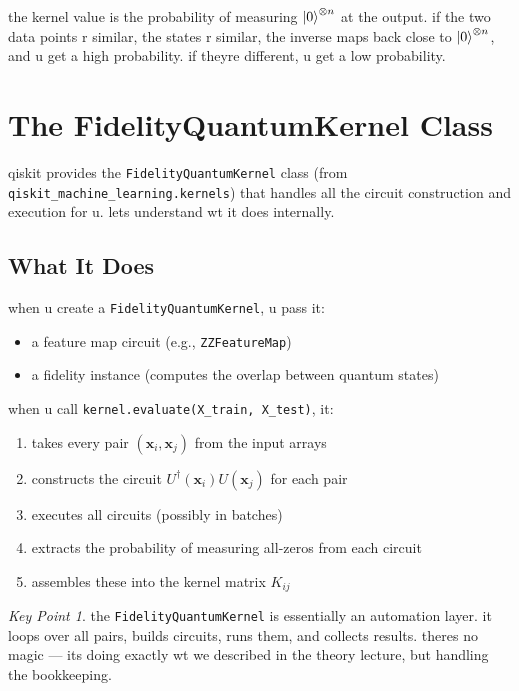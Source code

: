\documentclass[11pt,a4paper]{article}
\theoremstyle{definition}
\theoremstyle{remark}
\newtheorem*{keypoint}{Key Point}
\begin{document}
the kernel value is the probability of measuring $\ket{0}^{\otimes n}$ at the output. if the two data points r similar, the states r similar, the inverse maps back close to $\ket{0}^{\otimes n}$, and u get a high probability. if theyre different, u get a low probability.

\section{The FidelityQuantumKernel Class}

qiskit provides the \texttt{FidelityQuantumKernel} class (from \texttt{qiskit\_machine\_learning.kernels}) that handles all the circuit construction and execution for u. lets understand wt it does internally.

\subsection{What It Does}

when u create a \texttt{FidelityQuantumKernel}, u pass it:
\begin{itemize}[leftmargin=*]
    \item a feature map circuit (e.g., \texttt{ZZFeatureMap})
    \item a fidelity instance (computes the overlap between quantum states)
\end{itemize}

when u call \texttt{kernel.evaluate(X\_train, X\_test)}, it:
\begin{enumerate}[leftmargin=*]
    \item takes every pair $(\mathbf{x}_i, \mathbf{x}_j)$ from the input arrays
    \item constructs the circuit $U^\dagger(\mathbf{x}_i) U(\mathbf{x}_j)$ for each pair
    \item executes all circuits (possibly in batches)
    \item extracts the probability of measuring all-zeros from each circuit
    \item assembles these into the kernel matrix $K_{ij}$
\end{enumerate}

\begin{keypoint}
the \texttt{FidelityQuantumKernel} is essentially an automation layer. it loops over all pairs, builds circuits, runs them, and collects results. theres no magic --- its doing exactly wt we described in the theory lecture, but handling the bookkeeping.
\end{keypoint}
\end{document}
